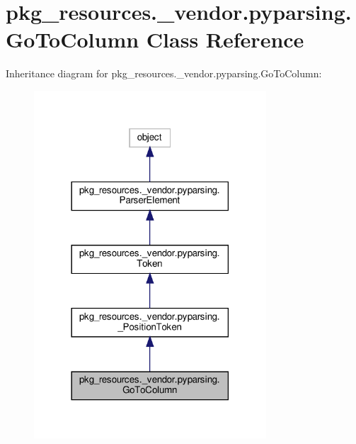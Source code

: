 \hypertarget{classpkg__resources_1_1__vendor_1_1pyparsing_1_1GoToColumn}{}\section{pkg\+\_\+resources.\+\_\+vendor.\+pyparsing.\+Go\+To\+Column Class Reference}
\label{classpkg__resources_1_1__vendor_1_1pyparsing_1_1GoToColumn}


Inheritance diagram for pkg\+\_\+resources.\+\_\+vendor.\+pyparsing.\+Go\+To\+Column\+:
\nopagebreak
\begin{figure}[H]
\begin{center}
\leavevmode
\includegraphics[width=246pt]{classpkg__resources_1_1__vendor_1_1pyparsing_1_1GoToColumn__inherit__graph}
\end{center}
\end{figure}


